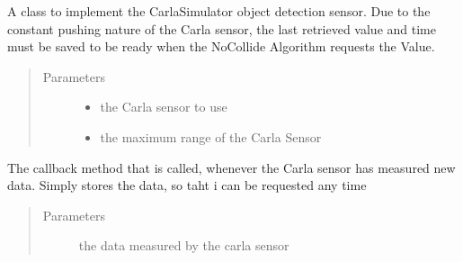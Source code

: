 \documentclass[letterpaper,10pt,english]{sphinxmanual}
\begin{document}
\begin{fulllineitems}
\label{\detokenize{sim_interfaces:lib.sim_interfaces.SimSensor}}
A class to implement the Carla\sphinxhyphen{}Simulator object detection sensor. Due to the constant pushing nature of the Carla sensor,
the last retrieved value and time must be saved to be ready when the NoCollide Algorithm requests the Value.
\begin{quote}\begin{description}
\item[{Parameters}] \leavevmode\begin{itemize}
\item {} 
 \textendash{} the Carla sensor to use

\item {} 
 \textendash{} the maximum range of the Carla Sensor

\end{itemize}

\end{description}\end{quote}

\begin{fulllineitems}
\label{\detokenize{sim_interfaces:lib.sim_interfaces.SimSensor.callback}}
The callback method that is called, whenever the Carla sensor has measured new data. Simply stores the data,
so taht i can be requested any time
\begin{quote}\begin{description}
\item[{Parameters}] \leavevmode
{} \textendash{} the data measured by the carla sensor

\end{description}\end{quote}

\end{fulllineitems}



\end{fulllineitems}
\end{document}
